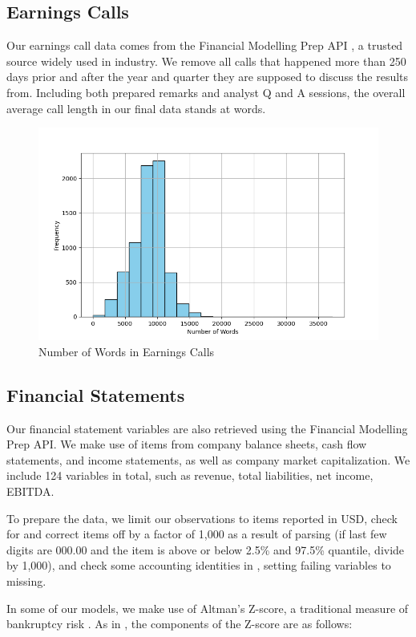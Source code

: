 \documentclass{article}[11pt]
\begin{document}
    \subsection*{Earnings Calls}

    Our earnings call data comes from the Financial Modelling Prep API \citep{financial_modeling_prep_financial_2024}, a trusted source widely used in industry. We remove all calls that happened more than 250 days prior and after the year and quarter they are supposed to discuss the results from. Including both prepared remarks and analyst Q and A sessions, the overall average call length in our final data stands at \avgCallLength \space words.

    \begin{figure}[h!]
		\centering
        \caption{Number of Words in Earnings Calls}
        \includegraphics[width=0.5\linewidth,keepaspectratio=true]{../Output/All Data EDA/NLP EDA/all_data_num_words_distribution_no_title.png}
	\end{figure}

    \subsection*{Financial Statements}

    Our financial statement variables are also retrieved using the Financial Modelling Prep API. We make use of items from company balance sheets, cash flow statements, and income statements, as well as company market capitalization. We include 124 variables in total, such as revenue, total liabilities, net income, EBITDA. %
    
    To prepare the data, we limit our observations to items reported in USD, check for and correct items off by a factor of 1,000 as a result of parsing (if last few digits are 000.00 and the item is above or below 2.5\% and 97.5\% quantile, divide by 1,000), and check some accounting identities in \cite{das_credit_2023}, setting failing variables to missing.

    In some of our models, we make use of Altman's Z-score, a traditional measure of bankruptcy risk \citep{altman_financial_1968}. As in \cite{das_credit_2023}, the components of the Z-score are as follows:
\end{document}
